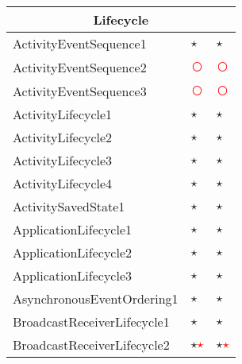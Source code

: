 \documentclass[../draft.tex]{subfiles}
\newcommand{\fp}{\textcolor{white}{\textcircled{\textcolor{red}{$\star$}}}}
\newcommand{\fn}{\textcolor{red}{\textcircled{ }}}
\newcommand{\tp}[0]{\textcircled{$\star$}}
\newcommand{\tsub}[1]{\multicolumn{3}{c}{#1}\\\hline}
\begin{document}
\begin{longtable}{l | l | l}
        \tsub{Lifecycle}
        ActivityEventSequence1 & \tp & \tp\\
        ActivityEventSequence2 & \fn & \fn\\
        ActivityEventSequence3 & \fn & \fn\\
        ActivityLifecycle1 & \tp & \tp\\
        ActivityLifecycle2 & \tp & \tp\\
        ActivityLifecycle3 & \tp & \tp\\
        ActivityLifecycle4 & \tp & \tp\\
        ActivitySavedState1 & \tp & \tp\\
        ApplicationLifecycle1 & \tp & \tp\\
        ApplicationLifecycle2 & \tp & \tp\\
        ApplicationLifecycle3 & \tp & \tp\\
        AsynchronousEventOrdering1 & \tp & \tp\\
        BroadcastReceiverLifecycle1 & \tp & \tp\\
        BroadcastReceiverLifecycle2 & \tp \fp & \tp \fp\\

\end{longtable}
\end{document}

